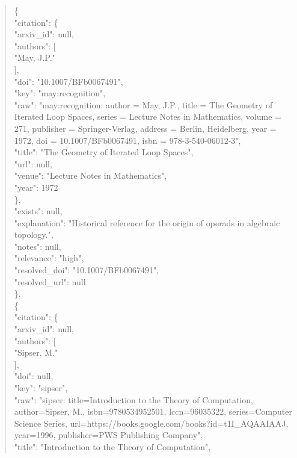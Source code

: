 \documentclass[11pt]{article}
\begin{document}
\begin{quote}
    \{\\
      "citation": \{\\
        "arxiv\_id": null,\\
        "authors": [\\
          "May, J.P."\\
        ],\\
        "doi": "10.1007/BFb0067491",\\
        "key": "may:recognition",\\
        "raw": "may:recognition: author = May, J.P., title = The Geometry of Iterated Loop Spaces, series = Lecture Notes in Mathematics, volume = 271, publisher = Springer-Verlag, address = Berlin, Heidelberg, year = 1972, doi = 10.1007/BFb0067491, isbn = 978-3-540-06012-3",\\
        "title": "The Geometry of Iterated Loop Spaces",\\
        "url": null,\\
        "venue": "Lecture Notes in Mathematics",\\
        "year": 1972\\
      \},\\
      "exists": null,\\
      "explanation": "Historical reference for the origin of operads in algebraic topology.",\\
      "notes": null,\\
      "relevance": "high",\\
      "resolved\_doi": "10.1007/BFb0067491",\\
      "resolved\_url": null\\
    \},\\
    \{\\
      "citation": \{\\
        "arxiv\_id": null,\\
        "authors": [\\
          "Sipser, M."\\
        ],\\
        "doi": null,\\
        "key": "sipser",\\
        "raw": "sipser: title=Introduction to the Theory of Computation, author=Sipser, M., isbn=9780534952501, lccn=96035322, series=Computer Science Series, url=https://books.google.com/books?id=t1I\_AQAAIAAJ, year=1996, publisher=PWS Publishing Company",\\
        "title": "Introduction to the Theory of Computation",\\

\end{quote}
\end{document}
